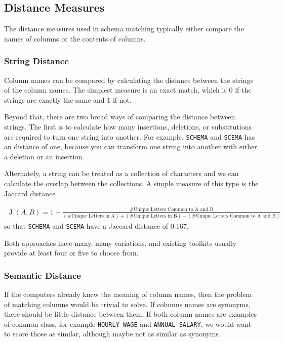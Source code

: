 \documentclass{datamade}
\theoremstyle{definition}
\theoremstyle{remark}
\begin{document}
\subsection*{Distance Measures}
The distance measures used in schema matching typically either compare
the names of columns or the contents of columns.

\subsubsection*{String Distance}
Column names can be compared by calculating the distance between the
strings of the column names. The simplest measure is an exact match,
which is $0$ if the strings are exactly the same and $1$ if not.

Beyond that, there are two broad ways of comparing the distance
between strings. The first is to calculate how many insertions,
deletions, or substitutions are required to turn one string into
another. For example, \verb+SCHEMA+ and \verb+SCEMA+ has an distance
of one, because you can transform one string into another with either
a deletion or an insertion.

Alternately, a string can be treated as a collection of characters and
we can calculate the overlap between the collections. A simple measure
of this type is the Jaccard distance

\begin{align*}
\operatorname{J}(A, B) = 1 - \frac{\text{\# Unique Letters
    Common to A and B}}{(\text{\# Unique Letters in A}) +
    (\text{\# Unique Letters in B}) - (\text{\# Unique Letters
      Common to A and B})}
\end{align*}
so that \verb+SCHEMA+ and \verb+SCEMA+ have a Jaccard distance of $0.167$. 

Both approaches have many, many variations, and existing toolkits
usually provide at least four or five to choose from.

\subsubsection*{Semantic Distance}
If the computers already knew the meaning of column names, then the
problem of matching columns would be trivial to solve.  If columns
names are synonyms, there should be little distance between them.  If
both column names are examples of common class, for example
\verb+HOURLY WAGE+ and \verb+ANNUAL SALARY+, we would want to score
those as similar, although maybe not as similar as synonyms.
\end{document}
